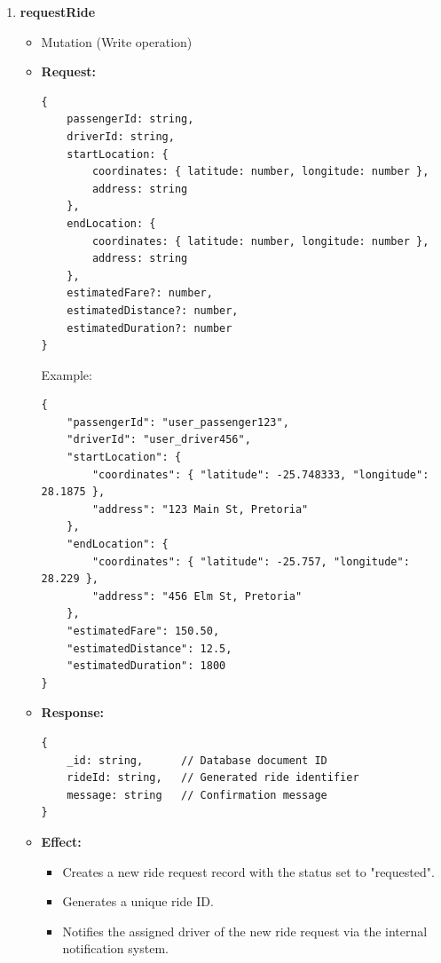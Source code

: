 \documentclass[a4paper,12pt]{article}
\begin{document}
\begin{enumerate}
    \item \textbf{requestRide}
    \begin{itemize}
        \item Mutation (Write operation)
        \item \textbf{Request:}
        \begin{verbatim}
{
    passengerId: string,
    driverId: string,
    startLocation: {
        coordinates: { latitude: number, longitude: number },
        address: string
    },
    endLocation: {
        coordinates: { latitude: number, longitude: number },
        address: string
    },
    estimatedFare?: number,
    estimatedDistance?: number,
    estimatedDuration?: number
}
        \end{verbatim}
        Example:
        \begin{verbatim}
{
    "passengerId": "user_passenger123",
    "driverId": "user_driver456",
    "startLocation": {
        "coordinates": { "latitude": -25.748333, "longitude": 28.1875 },
        "address": "123 Main St, Pretoria"
    },
    "endLocation": {
        "coordinates": { "latitude": -25.757, "longitude": 28.229 },
        "address": "456 Elm St, Pretoria"
    },
    "estimatedFare": 150.50,
    "estimatedDistance": 12.5,
    "estimatedDuration": 1800
}
        \end{verbatim}
        \item \textbf{Response:}
        \begin{verbatim}
{
    _id: string,      // Database document ID
    rideId: string,   // Generated ride identifier
    message: string   // Confirmation message
}
        \end{verbatim}
        \item \textbf{Effect:}
        \begin{itemize}
            \item Creates a new ride request record with the status set to "requested".
            \item Generates a unique ride ID.
            \item Notifies the assigned driver of the new ride request via the internal notification system.
        \end{itemize}
    \end{itemize}


\end{enumerate}
\end{document}
